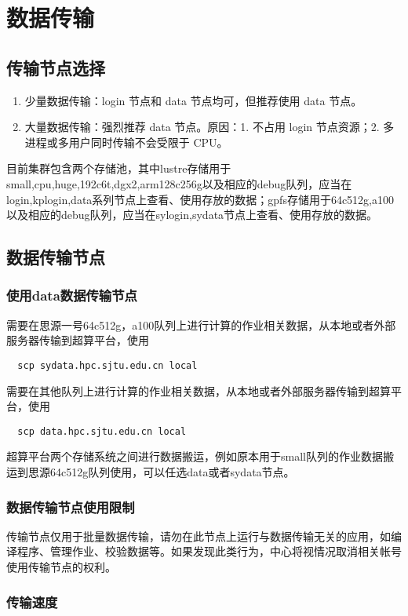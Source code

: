 \documentclass[cn, 12pt, hang, black, chinese]{elegantbook}
\begin{document}
\chapter{数据传输}

\section{传输节点选择}
\begin{enumerate}
\item 少量数据传输：login 节点和 data 节点均可，但推荐使用 data 节点。
\item 大量数据传输：强烈推荐 data 节点。原因：1. 不占用 login 节点资源；2. 多进程或多用户同时传输不会受限于 CPU。
\end{enumerate}
目前集群包含两个存储池，其中lustre存储用于small,cpu,huge,192c6t,dgx2,arm128c256g以及相应的debug队列，应当在login,kplogin,data系列节点上查看、使用存放的数据；gpfs存储用于64c512g,a100以及相应的debug队列，应当在sylogin,sydata节点上查看、使用存放的数据。

\section{数据传输节点}

\subsection*{使用data数据传输节点}
需要在思源一号64c512g，a100队列上进行计算的作业相关数据，从本地或者外部服务器传输到超算平台，使用
\begin{lstlisting}
  scp sydata.hpc.sjtu.edu.cn local
\end{lstlisting}
需要在其他队列上进行计算的作业相关数据，从本地或者外部服务器传输到超算平台，使用
\begin{lstlisting}
  scp data.hpc.sjtu.edu.cn local
\end{lstlisting}
超算平台两个存储系统之间进行数据搬运，例如原本用于small队列的作业数据搬运到思源64c512g队列使用，可以任选data或者sydata节点。

\subsection*{数据传输节点使用限制}
传输节点仅用于批量数据传输，请勿在此节点上运行与数据传输无关的应用，如编译程序、管理作业、校验数据等。如果发现此类行为，中心将视情况取消相关帐号使用传输节点的权利。

\subsection*{传输速度}
\end{document}

